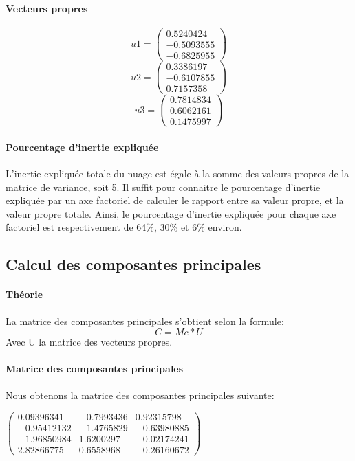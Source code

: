 \documentclass{report}
\begin{document}
\paragraph{Vecteurs propres}
\begin{equation}
u1 =
\begin{pmatrix}
    0.5240424\\
    -0.5093555\\
    -0.6825955
\end{pmatrix}
\end{equation}
\begin{equation}
u2 =
\begin{pmatrix}
    0.3386197\\
    -0.6107855\\
    0.7157358
\end{pmatrix}
\end{equation}
\begin{equation}
u3 =
\begin{pmatrix}
    0.7814834\\
    0.6062161\\
    0.1475997
\end{pmatrix}
\end{equation}
\paragraph{Pourcentage d'inertie expliquée}
L'inertie expliquée totale du nuage est égale à la somme des valeurs propres de la matrice de variance, soit 5. Il suffit pour connaitre le pourcentage d'inertie expliquée par un axe factoriel de calculer le rapport entre sa valeur propre, et la valeur propre totale. Ainsi, le pourcentage d'inertie expliquée pour chaque axe factoriel est respectivement de 64\%, 30\% et 6\% environ.
\subsection{Calcul des composantes principales}
\paragraph{Théorie}
La matrice des composantes principales s'obtient selon la formule:
\begin{equation}
C = Mc * U
\end{equation}
Avec U la matrice des vecteurs propres.
\paragraph{Matrice des composantes principales}
Nous obtenons la matrice des composantes principales suivante:
\begin{center}
    $\begin{pmatrix}
        0.09396341 & -0.7993436 & 0.92315798\\
        -0.95412132 & -1.4765829 & -0.63980885\\
        -1.96850984 & 1.6200297 & -0.02174241\\
        2.82866775 & 0.6558968 & -0.26160672
    \end{pmatrix}$
\end{center}
\end{document}
